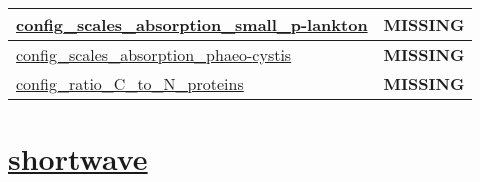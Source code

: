 {\begin{center}
\begin{longtable}{| p{2.0in} || p{4.0in} |}
    \hline
    \hyperref[subsec:nm_sec_config_scales_absorption_small_plankton]{config\_scales\_absorption\_small\_p-}\hyperref[subsec:nm_sec_config_scales_absorption_small_plankton]{lankton}& {\bf \color{red} MISSING} \\
    \hline
    \hyperref[subsec:nm_sec_config_scales_absorption_phaeocystis]{config\_scales\_absorption\_phaeo-}\hyperref[subsec:nm_sec_config_scales_absorption_phaeocystis]{cystis}& {\bf \color{red} MISSING} \\
    \hline
    \hyperref[subsec:nm_sec_config_ratio_C_to_N_proteins]{config\_ratio\_C\_to\_N\_proteins} & {\bf \color{red} MISSING} \\
    \hline
\end{longtable}
\end{center}
}
\section[shortwave]{\hyperref[sec:nm_sec_shortwave]{shortwave}}
\label{sec:nm_tab_shortwave}
\vspace{0.5in}
